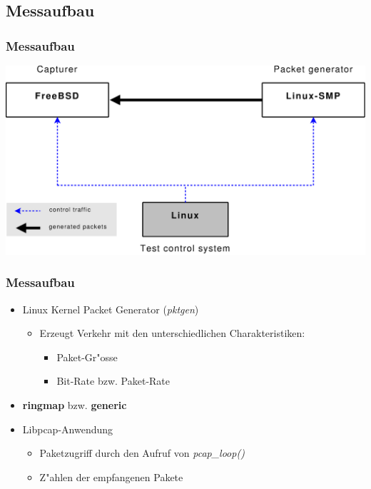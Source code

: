 \documentclass{beamer}
\begin{document}
\subsection*{Messaufbau}
\begin{frame}
\frametitle{Messaufbau}
\begin{center}
\includegraphics [height=0.68\textheight]{pics/Messaufbau}
\end{center}
\end{frame}

\begin{frame}
\frametitle{Messaufbau}
\begin{itemize}
	\item <1->Linux Kernel Packet Generator (\emph{pktgen})
		\begin{itemize}
			\item <1->Erzeugt Verkehr mit den unterschiedlichen Charakteristiken: 
				\begin{itemize}
					\item <1->Paket-Gr"osse
					\item <1->Bit-Rate bzw. Paket-Rate
				\end{itemize}
		\end{itemize}
\end{itemize}
\begin{itemize}
	\item <2->\textbf{ringmap} bzw. \textbf{generic}
	\item <2->Libpcap-Anwendung
		\begin{itemize}
			\item <2->Paketzugriff durch den Aufruf von \emph{pcap\_loop()}
			\item <2->Z"ahlen der empfangenen Pakete
		\end{itemize}
\end{itemize}
\end{frame}
\end{document}
